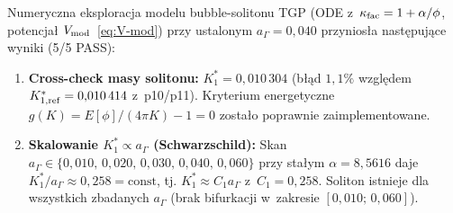 \begin{result}%
\label{res:op3-alphak}
Numeryczna eksploracja modelu bubble-solitonu TGP
(ODE z~$\kappa_{\rm fac}=1+\alpha/\phi$, potencja\l{}
$V_{\rm mod}$~\eqref{eq:V-mod}) przy ustalonym $a_\Gamma = 0{,}040$
przynios\l{}a nast\k{e}puj\k{a}ce wyniki (5/5 PASS):
\begin{enumerate}[nosep]
  \item \textbf{Cross-check masy solitonu:}
    $K^*_1 = 0{,}010\,304$ (b\l{}\k{a}d $1{,}1\%$ wzgl\k{e}dem
    $K^*_{1,\rm ref} = 0{,}010\,414$ z~p10/p11).
    Kryterium energetyczne $g(K)= E[\phi]/(4\pi K)-1=0$
    zosta\l{}o poprawnie zaimplementowane.

  \item \textbf{Skalowanie $K^*_1 \propto a_\Gamma$ (Schwarzschild):}
    Skan $a_\Gamma \in \{0{,}010,\,0{,}020,\,0{,}030,\,0{,}040,\,0{,}060\}$
    przy sta\l{}ym $\alpha = 8{,}5616$ daje
    $K^*_1/a_\Gamma \approx 0{,}258 = \mathrm{const}$, tj.
    $K^*_1 \approx C_1 a_\Gamma$ z~$C_1 = 0{,}258$.
    Soliton istnieje dla wszystkich zbadanych $a_\Gamma$
    (brak bifurkacji w~zakresie $[0{,}010;\,0{,}060]$).


\end{enumerate}
\end{result}
